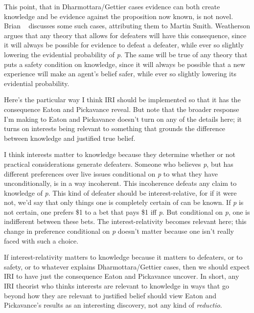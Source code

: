 This point, that in Dharmottara\slash Gettier cases evidence can both create knowledge and be evidence against the proposition now known, is not novel. Brian ~\citep{Weatherson2014-ProbScept} discusses some such cases, attributing them to Martin Smith. Weatherson argues that any theory that allows for defeaters will have this consequence, since it will always be possible for evidence to defeat a defeater, while ever so slightly lowering the evidential probability of \emph{p}. The same will be true of any theory that puts a safety condition on knowledge, since it will always be possible that a new experience will make an agent's belief safer, while ever so slightly lowering its evidential probability.

Here's the particular way I think IRI should be implemented so that it has the consequence Eaton and Pickavance reveal. But note that the broader response I'm making to Eaton and Pickavance doesn't turn on any of the details here; it turns on interests being relevant to something that grounds the difference between knowledge and justified true belief.

I think interests matter to knowledge because they determine whether or not practical considerations generate defeaters. Someone who believes \emph{p}, but has different preferences over live issues conditional on \emph{p} to what they have unconditionally, is in a way incoherent. This incoherence defeats any claim to knowledge of \emph{p}. This kind of defeater should be interest-relative, for if it were not, we'd say that only things one is completely certain of can be known. If \emph{p} is not certain, one prefers \$1 to a bet that pays \$1 iff \emph{p}. But conditional on \emph{p}, one is indifferent between these bets. The interest-relativity becomes relevant here; this change in preference conditional on \emph{p} doesn't matter because one isn't really faced with such a choice.

If interest-relativity matters to knowledge because it matters to defeaters, or to safety, or to whatever explains Dharmottara\slash Gettier cases, then we should expect IRI to have just the consequence Eaton and Pickavance uncover. In short, any IRI theorist who thinks interests are relevant to knowledge in ways that go beyond how they are relevant to justified belief should view Eaton and Pickavance's results as an interesting discovery, not any kind of \emph{reductio}.
